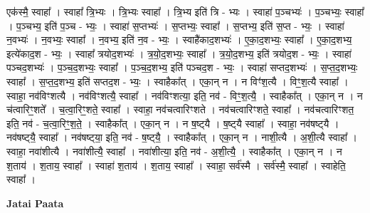 \documentclass[17pt]{extarticle}
\begin{document}
एक॑स्मै॒ स्वाहा᳚ । स्वाहा᳚ त्रि॒भ्यः । त्रि॒भ्यः स्वाहा᳚ । त्रि॒भ्य इति॑ त्रि - भ्यः । स्वाहा॑ प॒ञ्चभ्यः॑ । प॒ञ्चभ्यः॒ स्वाहा᳚ । प॒ञ्चभ्य॒ इति॑ प॒ञ्च - भ्यः॒ । स्वाहा॑ स॒प्तभ्यः॑ । स॒प्तभ्यः॒ स्वाहा᳚ । स॒प्तभ्य॒ इति॑ स॒प्त - भ्यः॒ । स्वाहा॑ न॒वभ्यः॑ । न॒वभ्यः॒ स्वाहा᳚ । न॒वभ्य॒ इति॑ न॒व - भ्यः॒ । स्वाहै॑काद॒शभ्यः॑ । ए॒का॒द॒शभ्यः॒ स्वाहा᳚ । ए॒का॒द॒शभ्य॒ इत्ये॑काद॒श - भ्यः॒ । स्वाहा᳚ त्रयोद॒शभ्यः॑ । त्र॒यो॒द॒शभ्यः॒ स्वाहा᳚ । त्र॒यो॒द॒शभ्य॒ इति॑ त्रयोद॒श - भ्यः॒ । स्वाहा॑ पञ्चद॒शभ्यः॑ । प॒ञ्च॒द॒शभ्यः॒ स्वाहा᳚ । प॒ञ्च॒द॒शभ्य॒ इति॑ पञ्चद॒श - भ्यः॒ । स्वाहा॑ सप्तद॒शभ्यः॑ । स॒प्त॒द॒शभ्यः॒ स्वाहा᳚ । स॒प्त॒द॒शभ्य॒ इति॑ सप्तद॒श - भ्यः॒ । स्वाहैका᳚त् । एका॒न् न । न विꣳ॑श॒त्यै । विꣳ॒॒श॒त्यै स्वाहा᳚ । स्वाहा॒ नव॑विꣳशत्यै । नव॑विꣳशत्यै॒ स्वाहा᳚ । नव॑विꣳशत्या॒ इति॒ नव॑ - विꣳ॒॒श॒त्यै॒ । स्वाहैका᳚त् । एका॒न् न । न च॑त्वारिꣳ॒॒शते᳚ । च॒त्वा॒रिꣳ॒॒शते॒ स्वाहा᳚ । स्वाहा॒ नव॑चत्वारिꣳशते । नव॑चत्वारिꣳशते॒ स्वाहा᳚ । नव॑चत्वारिꣳशत॒ इति॒ नव॑ - च॒त्वा॒रिꣳ॒॒श॒ते॒ । स्वाहैका᳚त् । एका॒न् न । न ष॒ष्ट्‍यै । ष॒ष्ट्‍यै स्वाहा᳚ । स्वाहा॒ नव॑षष्ट्‍यै । नव॑षष्ट्‍यै॒ स्वाहा᳚ । नव॑षष्ट्‍या॒ इति॒ नव॑ - ष॒ष्ट्‍यै॒ । स्वाहैका᳚त् । एका॒न् न । नाशी॒त्यै । अ॒शी॒त्यै स्वाहा᳚ । स्वाहा॒ नवा॑शीत्यै । नवा॑शीत्यै॒ स्वाहा᳚ । नवा॑शीत्या॒ इति॒ नव॑ - अ॒शी॒त्यै॒ । स्वाहैका᳚त् । एका॒न् न । न श॒ताय॑ । श॒ताय॒ स्वाहा᳚ । स्वाहा॑ श॒ताय॑ । श॒ताय॒ स्वाहा᳚ । स्वाहा॒ सर्व॑स्मै । सर्व॑स्मै॒ स्वाहा᳚ । स्वाहेति॒ स्वाहा᳚ । \newline

\textbf{Jatai Paata} \newline
\end{document}
